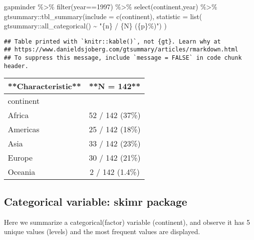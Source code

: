 \documentclass[
]{book}
\newenvironment{Shaded}{\begin{snugshade}}{\end{snugshade}}
\newcommand{\AttributeTok}[1]{\textcolor[rgb]{0.77,0.63,0.00}{#1}}
\newcommand{\DecValTok}[1]{\textcolor[rgb]{0.00,0.00,0.81}{#1}}
\newcommand{\FunctionTok}[1]{\textcolor[rgb]{0.00,0.00,0.00}{#1}}
\newcommand{\NormalTok}[1]{#1}
\newcommand{\SpecialCharTok}[1]{\textcolor[rgb]{0.00,0.00,0.00}{#1}}
\newcommand{\StringTok}[1]{\textcolor[rgb]{0.31,0.60,0.02}{#1}}
\begin{document}
\begin{Shaded}
\begin{Highlighting}[]
\NormalTok{gapminder }\SpecialCharTok{\%\textgreater{}\%} 
  \FunctionTok{filter}\NormalTok{(year}\SpecialCharTok{==}\DecValTok{1997}\NormalTok{) }\SpecialCharTok{\%\textgreater{}\%}
  \FunctionTok{select}\NormalTok{(continent,year) }\SpecialCharTok{\%\textgreater{}\%}
\NormalTok{  gtsummary}\SpecialCharTok{::}\FunctionTok{tbl\_summary}\NormalTok{(}\AttributeTok{include =} \FunctionTok{c}\NormalTok{(continent),}
                          \AttributeTok{statistic =} \FunctionTok{list}\NormalTok{(}
\NormalTok{      gtsummary}\SpecialCharTok{::}\FunctionTok{all\_categorical}\NormalTok{() }\SpecialCharTok{\textasciitilde{}} \StringTok{"\{n\} / \{N\} (\{p\}\%)"}\NormalTok{)}
\NormalTok{      )}
\end{Highlighting}
\end{Shaded}

\begin{verbatim}
## Table printed with `knitr::kable()`, not {gt}. Learn why at
## https://www.danieldsjoberg.com/gtsummary/articles/rmarkdown.html
## To suppress this message, include `message = FALSE` in code chunk header.
\end{verbatim}

\begin{tabular}{l|c}
\hline
**Characteristic** & **N = 142**\\
\hline
continent & \\
\hline
Africa & 52 / 142 (37\%)\\
\hline
Americas & 25 / 142 (18\%)\\
\hline
Asia & 33 / 142 (23\%)\\
\hline
Europe & 30 / 142 (21\%)\\
\hline
Oceania & 2 / 142 (1.4\%)\\
\hline
\end{tabular}

\hypertarget{categorical-variable-skimr-package}{%
\subsection{Categorical variable: skimr package}\label{categorical-variable-skimr-package}}

Here we summarize a categorical(factor) variable (continent), and observe it has 5 unique values (levels) and the most frequent values are displayed.
\end{document}
